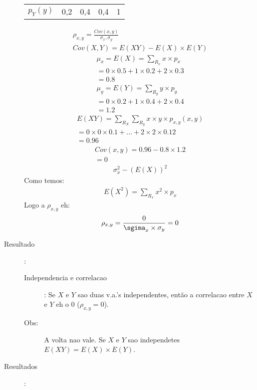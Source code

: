 \begin{description}
\begin{table}[H]
\begin{tabular}{c c c c c}
      $p_{Y} (y)$ & 0,2 & 0,4 &0,4 & 1 \bottomrule
      \bottomrule
    \end{tabular}
  \end{table}
\begin{align*}
  \rho_{x,y} = \frac{Cov(x,y)}{\sigma_{x},\sigma_{y}}\\
  Cov(X,Y)=E(XY)-E(X) \times E(Y)
\end{align*}
\begin{align*}
  \mu_{x} =E(X)=\sum \limits_{R_{x}}x \times p_{x} \\
  = 0 \times 0.5 + 1 \times 0.2 + 2 \times 0.3 \\
  = 0.8
\end{align*}
\begin{align*}
  \mu_{y} =E(Y)=\sum \limits_{R_{y}}y \times p_{y} \\
  = 0 \times 0.2 + 1 \times 0.4 + 2 \times 0.4 \\
  =1.2 
\end{align*}
\begin{align*}
  E(XY) = \sum \limits_{R_{X}} \sum \limits_{R_{y}} x\times y \times p_{x,y}(x,y) \\
  = 0 \times 0 \times 0.1 + \ldots + 2 \times 2 \times 0.12\\
  = 0.96
\end{align*}
\begin{align*}
  Cov(x,y) = 0.96 - 0.8 \times 1.2 \\
  =0
\end{align*}
\begin{align*}
  \sigma_{x}^2 - \left(E(X)\right)^2
\end{align*}
Como temos:
\begin{align*}
  E(X^2) = \sum \limits_{R_{x}} x^2 \times  p_{x}
\end{align*}
Logo a $\rho_{x,y}$ eh:
\begin{align*}
  \rho_{x,y}  = \frac{0}{\sgima_{x} \times \sigma_{y}}=0 
\end{align*}
\item [Resultado]:
  \begin{description}
    \item[Independencia e correlacao]:  Se $X$ e $Y$ sao duas v.a.'s independentes, então a correlacao entre $X$ e $Y$ eh o $0$ ($\rho_{x,y}=0$).
    \item [Obs:]  A volta nao vale. Se $X$ e $Y$ sao independetes $E(XY)=E(X) \times E(Y)$.
    \end{description}
  \item [Resultados]:
    

\end{description}
